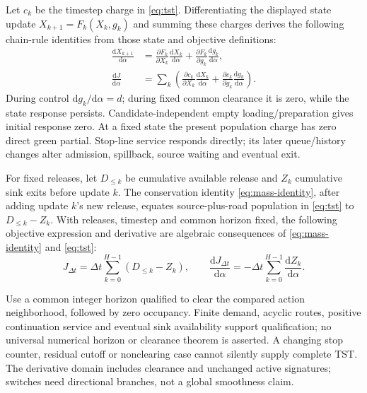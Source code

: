 \documentclass[10pt,a4paper]{article}
\newcommand{\rev}[1]{{\color{revisionred}#1}}
\begin{document}
Let $c_k$ be the timestep charge in \eqref{eq:tst}. Differentiating
the displayed state update $X_{k+1}=F_k(X_k,g_k)$ and summing these charges
\rev{derives the following chain-rule identities from those state and objective definitions:}
\begin{equation}
 \begin{aligned}
 \frac{\mathrm dX_{k+1}}{\mathrm d\alpha}
 &=\frac{\partial F_k}{\partial X_k}
            \frac{\mathrm dX_k}{\mathrm d\alpha}
  +\frac{\partial F_k}{\partial g_k}
            \frac{\mathrm dg_k}{\mathrm d\alpha},\\
 \frac{\mathrm dJ}{\mathrm d\alpha}
 &=\sum_k\left(
 \frac{\partial c_k}{\partial X_k}\frac{\mathrm dX_k}{\mathrm d\alpha}
 +\frac{\partial c_k}{\partial g_k}\frac{\mathrm dg_k}{\mathrm d\alpha}
 \right).
 \end{aligned}
 \label{eq:state-sensitivity}
\end{equation}
During control $\mathrm dg_k/\mathrm d\alpha=d$; during fixed common
clearance it is zero, while the state response persists. Candidate-independent
empty loading/preparation gives initial response zero. At a fixed state
the present population charge has zero direct green partial. Stop-line
service responds directly; its later queue/history changes alter admission,
spillback, source waiting and eventual exit.

\par\begin{samepage}
For fixed releases, let $D_{\leq k}$ be cumulative available release and
$Z_k$ cumulative sink exits before update $k$. The conservation identity \eqref{eq:mass-identity}, after adding
update $k$'s new release, equates source-plus-road population in
\eqref{eq:tst} to $D_{\leq k}-Z_k$. With releases, timestep and common
horizon fixed,
\rev{the following objective expression and derivative are algebraic consequences of \eqref{eq:mass-identity} and \eqref{eq:tst}:}
\begin{equation}
 J_{\Delta t}=\Delta t\sum_{k=0}^{H-1}(D_{\leq k}-Z_k),\qquad
 \frac{\mathrm dJ_{\Delta t}}{\mathrm d\alpha}
 =-\Delta t\sum_{k=0}^{H-1}\frac{\mathrm dZ_k}{\mathrm d\alpha}.
 \label{eq:exit-objective}
\end{equation}
\par\end{samepage}

\par

Use a common integer horizon qualified to clear the compared action
neighborhood, followed by zero occupancy. Finite demand, acyclic routes,
positive continuation service and eventual sink availability support
qualification; no universal numerical horizon or clearance theorem is
asserted. A changing stop counter, residual cutoff or nonclearing case
cannot silently supply complete TST. The derivative domain includes
clearance and unchanged active signatures; switches need directional
branches, not a global smoothness claim.
\end{document}
